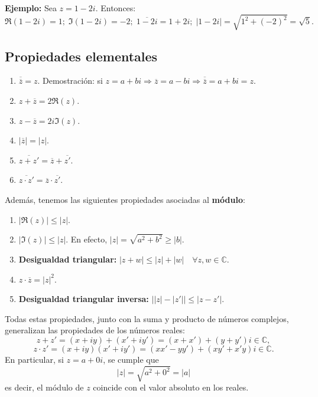 \documentclass[a4paper,12pt]{article}
\begin{document}
\noindent\textbf{Ejemplo:} Sea \( z = 1 - 2i \). Entonces:
\[
\Re(1-2i) = 1; \; \Im(1-2i) = -2; \; \overline{1-2i} = 1 + 2i; \; |1-2i| = \sqrt{1^2 + (-2)^2} = \sqrt{5}.
\]

\subsection{Propiedades elementales}

\begin{enumerate}
    \item $\overline{\overline{z}} = z$. \; Demostración: si $z = a + bi \Rightarrow \overline{z} = a - bi \Rightarrow \overline{\overline{z}} = a + bi = z$.
    \item $z + \overline{z} = 2 \Re(z)$.
    \item $z - \overline{z} = 2i \Im(z)$.
    \item $|\overline{z}| = |z|$.
    \item $\overline{z + z'} = \overline{z} + \overline{z'}$.
    \item $\overline{z \cdot z'} = \overline{z} \cdot \overline{z'}$.
\end{enumerate}

\newpage
\noindent
Además, tenemos las siguientes propiedades asociadas al \textbf{módulo}:
\begin{enumerate}
    \item $|\Re(z)| \leq |z|$.
    \item $|\Im(z)| \leq |z|$. \; En efecto, $|z| = \sqrt{a^2 + b^2} \geq |b|$.
    \item \textbf{Desigualdad triangular:} \; $|z+w| \leq |z| + |w| \quad \forall z,w \in \mathbb{C}$.
    \item $z \cdot \overline{z} = |z|^2$.
    \item \textbf{Desigualdad triangular inversa:} \; $\big||z| - |z'|\big| \leq |z-z'|$.
\end{enumerate}
\noindent
Todas estas propiedades, junto con la suma y producto de números complejos, generalizan las propiedades de los números reales:
\[
z+z' = (x+iy) + (x' + i y') = (x+x') + (y+y')i \in \mathbb{C},
\]
\[
z \cdot z' = (x+iy)(x'+iy') = (xx'-yy') + (xy'+x'y)i \in \mathbb{C}.
\]
En particular, si $z = a + 0i$, se cumple que
\[
|z| = \sqrt{a^2 + 0^2} = |a|
\]
es decir, el módulo de $z$ coincide con el valor absoluto en los reales.
\end{document}

